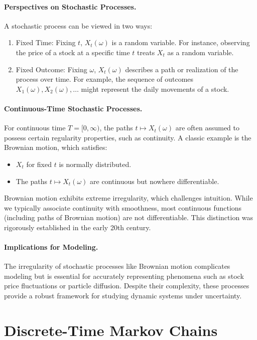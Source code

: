 \paragraph{Perspectives on Stochastic Processes.}
A stochastic process can be viewed in two ways:
\begin{enumerate}
    \item Fixed Time: Fixing \( t \), \( X_t(\omega) \) is a random variable. For instance, observing the price of a stock at a specific time \( t \) treats \( X_t \) as a random variable.
    \item Fixed Outcome: Fixing \( \omega \), \( X_t(\omega) \) describes a path or realization of the process over time. For example, the sequence of outcomes \( X_1(\omega), X_2(\omega), \dots \) might represent the daily movements of a stock.
\end{enumerate}

\paragraph{Continuous-Time Stochastic Processes.}
For continuous time \( T = [0, \infty) \), the paths \( t \mapsto X_t(\omega) \) are often assumed to possess certain regularity properties, such as continuity. A classic example is the Brownian motion, which satisfies:
\begin{itemize}
    \item \( X_t \) for fixed \( t \) is normally distributed.
    \item The paths \( t \mapsto X_t(\omega) \) are continuous but nowhere differentiable.
\end{itemize}
Brownian motion exhibits extreme irregularity, which challenges intuition. While we typically associate continuity with smoothness, most continuous functions (including paths of Brownian motion) are not differentiable. This distinction was rigorously established in the early 20th century.

\paragraph{Implications for Modeling.}
The irregularity of stochastic processes like Brownian motion complicates modeling but is essential for accurately representing phenomena such as stock price fluctuations or particle diffusion. Despite their complexity, these processes provide a robust framework for studying dynamic systems under uncertainty.

\section{Discrete-Time Markov Chains}


